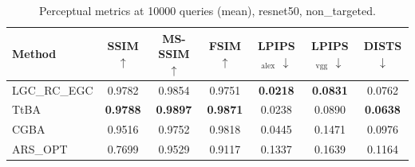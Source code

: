 \begin{table}[t]
\centering\footnotesize
\caption{Perceptual metrics at 10000 queries (mean), resnet50, non\_targeted.}
\begin{tabular}{lcccccc}
\toprule
Method & SSIM $\uparrow$ & MS-SSIM $\uparrow$ & FSIM $\uparrow$ & LPIPS$_{\mathrm{alex}}$ $\downarrow$ & LPIPS$_{\mathrm{vgg}}$ $\downarrow$ & DISTS $\downarrow$ \\
\midrule
LGC\_RC\_EGC & 0.9782 & 0.9854 & 0.9751 & \textbf{0.0218} & \textbf{0.0831} & 0.0762 \\
TtBA & \textbf{0.9788} & \textbf{0.9897} & \textbf{0.9871} & 0.0238 & 0.0890 & \textbf{0.0638} \\
CGBA & 0.9516 & 0.9752 & 0.9818 & 0.0445 & 0.1471 & 0.0976 \\
ARS\_OPT & 0.7699 & 0.9529 & 0.9117 & 0.1337 & 0.1639 & 0.1164 \\
\bottomrule
\end{tabular}
\end{table}

